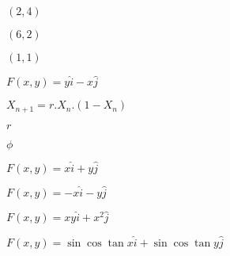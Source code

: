 \documentclass{article}
\begin{document}
${(2,4)}$
\pagebreak

${(6,2)}$
\pagebreak

${(1,1)}$
\pagebreak

${F(x,y) = y\hat{i} - x\hat{j}}$
\pagebreak

${X_{n+1} = r . X_n . (1 - X_n)}$
\pagebreak

${r}$
\pagebreak

${\phi}$
\pagebreak

${F(x,y) = x\hat{i} + y\hat{j}}$
\pagebreak

${F(x,y) = -x\hat{i} - y\hat{j}}$
\pagebreak

${F(x,y) = xy\hat{i} + x^2\hat{j}}$
\pagebreak

${F(x,y) = \sin{\cos{\tan{x}}}\hat{i} + \sin{\cos{\tan{y}}}\hat{j}}$
\pagebreak
\end{document}
